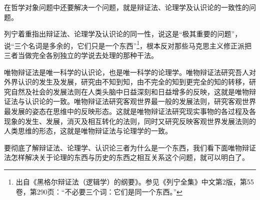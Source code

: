 \documentclass[UTF8, 12pt, a4paper]{ctexrep}
\begin{document}
在哲学对象问题中还要解决一个问题，就是辩证法、论理学及认识论的一致性的问题。

列宁着重指出辩证法、论理学及认识论的同一性，说这是“极其重要的问题”，说“三个名词是多余的，它们只是一个东西”\footnote{出自《黑格尔辩证法（逻辑学）的纲要》。参见《列宁全集》中文第2版，第55卷，第290页：“不必要三个词：它们是同一个东西。”}，根本反对那些马克思主义修正派把三者当做完全各别独立的学说去处理的那种干法。

唯物辩证法是唯一科学的认识论，也是唯一科学的论理学。唯物辩证法研究吾人对外界认识的发生及发展，研究由不知到知，由不完全的知到更完全的知的转移，研究自然及社会的发展法则在人类头脑中日益深刻和日益增多的反映，这就是唯物辩证法与认识论的一致。唯物辩证法研究客观世界最一般的发展法则，研究客观世界最发展的姿态在思维中的反映形态。这就是唯物辩证法研究现实事物的各过程及各现象的发生、发展，消灭及相互转化的法则，同时又研究反映客观世界发展法则的人类思维的形态，这就是唯物辩证法与论理学的一致。

要彻底了解辩证法、论理学、认识论三者为什么是一个东西，我们看下面唯物辩证法怎样解决关于论理的东西与历史的东西之相互关系这个问题，就可以明白了。
\end{document}
